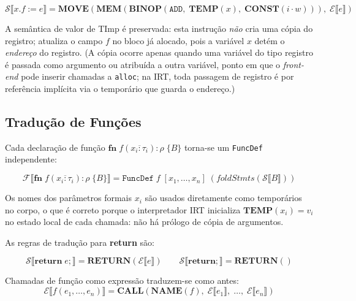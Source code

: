 \[
  \mathcal{S}\llbracket x.f \mathbin{:=} e \rrbracket =
  \mathbf{MOVE}\!\left(
    \mathbf{MEM}\!\left(
      \mathbf{BINOP}(\mathtt{ADD},\;
        \mathbf{TEMP}(x),\;
      \mathbf{CONST}(i \cdot w))
    \right),\;
    \mathcal{E}\llbracket e \rrbracket
  \right)
\]

A semântica de valor de TImp é preservada: esta instrução \emph{não} cria
uma cópia do registro; atualiza o campo \(f\) no bloco já alocado, pois a
variável \(x\) detém o \emph{endereço} do registro. (A cópia ocorre apenas
  quando uma variável do tipo registro é passada como argumento ou atribuída
  a outra variável, ponto em que o \emph{front-end} pode inserir chamadas a
  \texttt{alloc}; na IRT, toda passagem de registro é por referência implícita
via o temporário que guarda o endereço.)

\subsection{Tradução de Funções}
\label{sec:ir-timp-fn}

Cada declaração de função
\(\mathbf{fn}\; f(\overline{x_i : \tau_i}) : \rho\; \{B\}\)
torna-se um \texttt{FuncDef} independente:

\[
  \mathcal{F}\llbracket \mathbf{fn}\; f(\overline{x_i:\tau_i}):\rho\;\{B\}
  \rrbracket
  = \mathtt{FuncDef}\; f\; [x_1,\ldots,x_n]\;
  (\mathit{foldStmts}(\mathcal{S}\llbracket B \rrbracket))
\]

Os nomes dos parâmetros formais \(x_i\) são usados diretamente como
temporários no corpo, o que é correto porque o interpretador IRT inicializa
\(\mathbf{TEMP}(x_i) = v_i\) no estado local de cada chamada:
não há prólogo de cópia de argumentos.

As regras de tradução para \textbf{return} são:

\[
  \mathcal{S}\llbracket \mathbf{return}\; e \mathtt{;} \rrbracket =
  \mathbf{RETURN}(\mathcal{E}\llbracket e \rrbracket)
  \qquad
  \mathcal{S}\llbracket \mathbf{return} \mathtt{;} \rrbracket =
  \mathbf{RETURN}()
\]

Chamadas de função como expressão traduzem-se como antes:
\[
  \mathcal{E}\llbracket f(e_1,\ldots,e_n) \rrbracket =
  \mathbf{CALL}(\mathbf{NAME}(f),\;
    \mathcal{E}\llbracket e_1 \rrbracket,\;\ldots,\;
  \mathcal{E}\llbracket e_n \rrbracket)
\]

